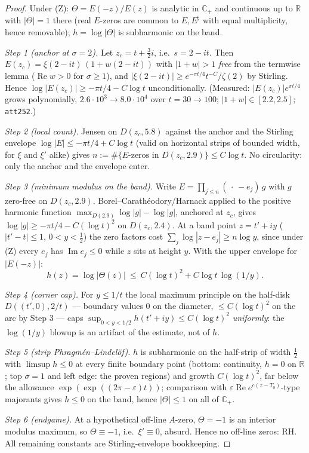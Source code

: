 \documentclass[11pt]{article}
\newcommand{\C}{\mathbb{C}}
\newcommand{\R}{\mathbb{R}}
\newcommand{\Hp}{\C_{+}}
\newcommand{\Th}{\Theta}
\begin{document}
\begin{proof}
Under (Z): $\Th=E(-z)/E(z)$ is analytic in $\Hp$ and continuous up to $\R$
with $|\Th|=1$ there (real $E$-zeros are common to $E,E^\sharp$ with equal
multiplicity, hence removable); $h=\log|\Th|$ is subharmonic on the band.

\emph{Step 1 (anchor at $\sigma=2$).} Let $z_c=t+\tfrac32 i$, i.e.\
$s=2-it$. Then $E(z_c)=\xi(2-it)\,(1+w(2-it))$ with $|1+w|>1$ \emph{free}
from the termwise lemma ($\operatorname{Re}w>0$ for $\sigma\ge1$), and
$|\xi(2-it)|\ge e^{-\pi t/4}t^{-C}/\zeta(2)$ by Stirling. Hence
$\log|E(z_c)|\ge-\pi t/4-C\log t$ unconditionally. (Measured:
$|E(z_c)|e^{\pi t/4}$ grows polynomially, $2.6\cdot10^3\to8.0\cdot10^4$ over
$t=30\to100$; $|1+w|\in[2.2,2.5]$; \texttt{att252}.)

\emph{Step 2 (local count).} Jensen on $D(z_c,5.8)$ against the anchor and
the Stirling envelope $\log|E|\le-\pi t/4+C\log t$ (valid on horizontal
strips of bounded width, for $\xi$ and $\xi'$ alike) gives
$n:=\#\{E\text{-zeros in }D(z_c,2.9)\}\le C\log t$. No circularity: only the
anchor and the envelope enter.

\emph{Step 3 (minimum modulus on the band).} Write $E=\prod_{j\le n}
(\,\cdot\,-e_j)\,g$ with $g$ zero-free on $D(z_c,2.9)$.
Borel--Carath\'eodory/Harnack applied to the positive harmonic function
$\max_{D(2.9)}\log|g|-\log|g|$, anchored at $z_c$, gives
$\log|g|\ge-\pi t/4-C(\log t)^2$ on $D(z_c,2.4)$. At a band point
$z=t'+iy$ ($|t'-t|\le1$, $0<y<\tfrac12$) the zero factors cost
$\sum_j\log|z-e_j|\ge n\log y$, since under (Z) every $e_j$ has
$\operatorname{Im}e_j\le0$ while $z$ sits at height $y$. With the upper
envelope for $|E(-z)|$:
\[ h(z)=\log|\Th(z)|\ \le\ C(\log t)^2+C\log t\,\log(1/y). \]

\emph{Step 4 (corner cap).} For $y\le1/t$ the local maximum principle on the
half-disk $D((t',0),2/t)$ --- boundary values $0$ on the diameter,
$\le C(\log t)^2$ on the arc by Step 3 --- caps
$\sup_{0<y<1/2}h(t'+iy)\le C(\log t)^2$ \emph{uniformly}: the $\log(1/y)$
blowup is an artifact of the estimate, not of $h$.

\emph{Step 5 (strip Phragm\'en--Lindel\"of).} $h$ is subharmonic on the
half-strip of width $\tfrac12$ with $\limsup h\le0$ at every finite boundary
point (bottom: continuity, $h=0$ on $\R$; top $\sigma=1$ and left edge: the
proven regions) and growth $C(\log t)^2$, far below the allowance
$\exp(\exp((2\pi-\varepsilon)t))$; comparison with
$\varepsilon\operatorname{Re}e^{c(z-T_0)}$-type majorants gives $h\le0$ on
the band, hence $|\Th|\le1$ on all of $\Hp$.

\emph{Step 6 (endgame).} At a hypothetical off-line $A$-zero,
$\Th=-1$ is an interior modulus maximum, so $\Th\equiv-1$, i.e.\ $\xi'\equiv0$,
absurd. Hence no off-line zeros: RH. All remaining constants are
Stirling-envelope bookkeeping.
\end{proof}
\end{document}

